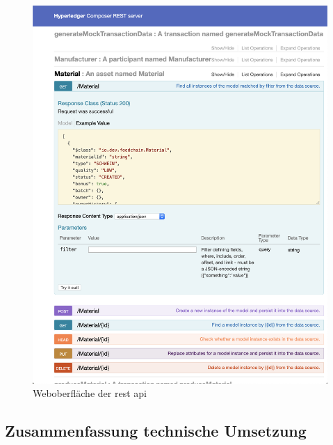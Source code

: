 \begin{figure}[H]
	\centering
	\includegraphics[width=1\linewidth]{pictures/rest-api-explorer}
	\caption[Weboberfläche der \ac{rest} \ac{api}]{Weboberfläche der \ac{rest} \ac{api}}
	\label{fig:rest-api-explorer}
\end{figure}


\subsection{Zusammenfassung technische Umsetzung}



\newpage
